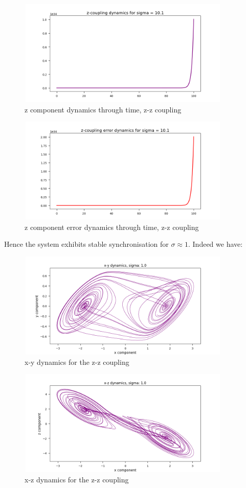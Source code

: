 \documentclass{article}
\begin{document}
\begin{figure}[H]
\centering
\includegraphics[width = 4in, height = 2in]{z_coupling_z_dynamics_s101.png}
\caption{z component dynamics through time, z-z coupling}
\end{figure}

\begin{figure}[H]
\centering
\includegraphics[width = 4in, height = 2in]{z_coupling_z_error_s101.png}
\caption{z component error dynamics through time, z-z coupling}
\end{figure}

Hence the system exhibits stable synchronisation for $\sigma \approx 1$. Indeed we have:

\begin{figure}[H]
\centering
\includegraphics[width = 4in, height = 2in]{z_coupling_xy.png}
\caption{x-y dynamics for the z-z coupling}
\end{figure}

\begin{figure}[H]
\centering
\includegraphics[width = 4in, height = 2in]{z_coupling_xz.png}
\caption{x-z dynamics for the z-z coupling}
\end{figure}
\end{document}
